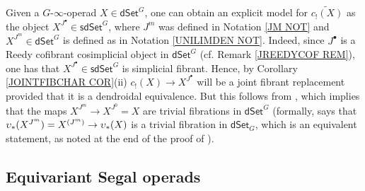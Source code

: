 \documentclass[a4paper,10pt
,draft
]{article}%
\begin{document}
\begin{remark}\label{CONCRECOM REM}
      Given a $G$-$\infty$-operad $X \in \mathsf{dSet}^G$,
      one can obtain an explicit model for $\widetilde{c_{!} (X)}$
      as the object $X^{J^{\bullet}} \in \mathsf{sdSet}^G$,
      where $J^{m}$ was defined in Notation \ref{JM NOT}
      and $X^{J^m}\in \mathsf{dSet}^G$ is defined as in 
      Notation \ref{UNILIMDEN NOT}.
      Indeed, since $J^{\bullet}$ is a Reedy cofibrant cosimplicial object in $\mathsf{dSet}^G$ (cf. Remark \ref{JREEDYCOF REM}),
      one has that $X^{J^{\bullet}} \in \mathsf{sdSet}^G$
      is simplicial fibrant.
      Hence, by Corollary \ref{JOINTFIBCHAR COR}(ii)
      $c_{!}(X) \to X^{J^{\bullet}}$
      will be a joint fibrant replacement provided that it is a dendroidal equivalence.
      But this follows from \cite[Cor. 8.21]{Per18},
      which implies that the maps $X^{J^m} \to X^{J^0}=X$
      are trivial fibrations in $\mathsf{dSet}^G$
      (formally, \cite[Cor. 8.21]{Per18} says that $\upsilon_{\**}(X^{J^m}) = X^{(J^m)} \to \upsilon_{\**}(X)$
      is a trivial fibration in $\mathsf{dSet}_G$, which is an equivalent statement, as noted at the end of the proof of \cite[Thm. 8.22]{Per18}).
%
\end{remark}




\subsection{Equivariant Segal operads}\label{PREOP SEC}
\end{document}
